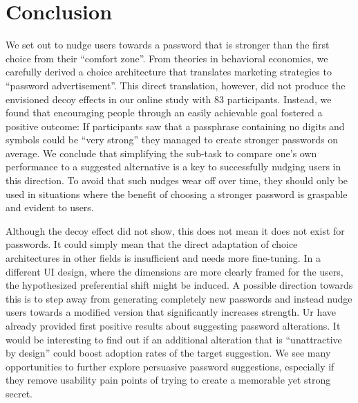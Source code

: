 \section{Conclusion}
We set out to nudge users towards a password that is stronger than the first choice from their ``comfort zone''. From theories in behavioral economics, we carefully derived a choice architecture that translates marketing strategies to ``password advertisement''. This direct translation, however, did not produce the envisioned decoy effects in our online study with 83 participants. Instead, we found that encouraging people through an easily achievable goal fostered a positive outcome: If participants saw that a passphrase containing no digits and symbols could be ``very strong'' they managed to create stronger passwords on average. We conclude that simplifying the sub-task to compare one's own performance to a suggested alternative is a key to successfully nudging users in this direction. To avoid that such nudges wear off over time, they should only be used in situations where the benefit of choosing a stronger password is graspable and evident to users. 


Although the decoy effect did not show, this does not mean it does not exist for passwords. It could simply mean that the direct adaptation of choice architectures in other fields is insufficient and needs more fine-tuning. In a different UI design, where the dimensions are more clearly framed for the users, the hypothesized preferential shift might be induced. A possible direction towards this is to step away from generating completely new passwords and instead nudge users towards a modified version that significantly increases strength. Ur \etal have already provided first positive results about suggesting password alterations. It would be interesting to find out if an additional alteration that is ``unattractive by design'' could boost adoption rates of the target suggestion. We see many opportunities to further explore persuasive password suggestions, especially if they remove usability pain points of trying to create a memorable yet strong secret. 

